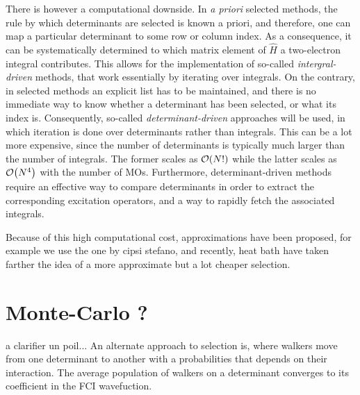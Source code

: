 \documentclass[./thesis.tex]{subfiles}
\begin{document}
There is however a computational downside. In \textit{a priori} selected methods, the rule by which determinants are selected is known a priori, and therefore, one can map a particular determinant to some row or column index.\cite{Knowles_1984} As a consequence, it can be systematically determined to which matrix element of $\widehat{H}$ a two-electron integral contributes. This allows for the implementation of so-called \emph{intergral-driven} methods, that work essentially by iterating over integrals.
On the contrary, in selected methods an explicit list has to be maintained, and there is no immediate way to know whether a determinant has been selected, or what its index is. Consequently, so-called \emph{determinant-driven} approaches will be used, in which iteration is done over determinants rather than integrals. This can be a lot more expensive, since the number of determinants is typically much larger than the number of integrals. The former scales as $\order{N!}$ while the latter scales as $\order{N^4}$ with the number of MOs.
Furthermore, determinant-driven methods require an effective way to compare determinants in order to extract the corresponding excitation operators, and a way to rapidly fetch the associated integrals.

Because of this high computational cost, approximations have been proposed, for example we use the one by \alert{cipsi stefano}, and recently, \alert{heat bath} have taken farther the idea of a more approximate but a lot cheaper selection.

\section{Monte-Carlo ?}
\alert{a clarifier un poil...} An alternate approach to selection is, where walkers move from one determinant to another with a probabilities that depends on their interaction. The average population of walkers on a determinant converges to its coefficient in the FCI wavefuction. 
\end{document}
